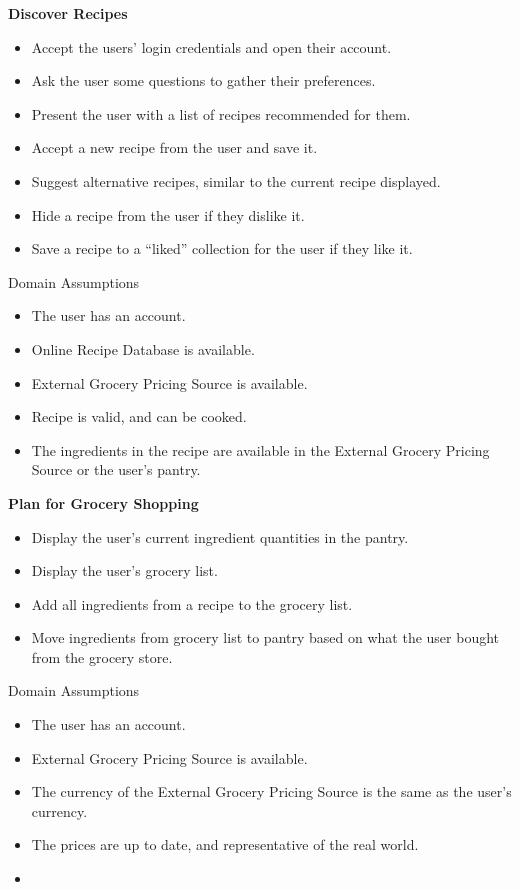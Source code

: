 \documentclass[11pt, letterpaper]{report}
\begin{document}
\noindent \textbf{Discover Recipes}
\begin{itemize}
    \item Accept the users’ login credentials and open their account.
    \item Ask the user some questions to gather their preferences.
    \item Present the user with a list of recipes recommended for them.
    \item Accept a new recipe from the user and save it.
    \item Suggest alternative recipes, similar to the current recipe displayed.
    \item Hide a recipe from the user if they dislike it.
    \item Save a recipe to a “liked” collection for the user if they like it.
\end{itemize}
Domain Assumptions
\begin{itemize}
    \item The user has an account.
    \item Online Recipe Database is available.
    \item External Grocery Pricing Source is available.
    \item Recipe is valid, and can be cooked.
    \item The ingredients in the recipe are available in the External Grocery Pricing Source or the user’s pantry.
\end{itemize}

\noindent \textbf{Plan for Grocery Shopping}
\begin{itemize}
    \item Display the user’s current ingredient quantities in the pantry.
    \item Display the user’s grocery list.
    \item Add all ingredients from a recipe to the grocery list.
    \item Move ingredients from grocery list to pantry based on what the user bought from the grocery store.
\end{itemize}
Domain Assumptions
\begin{itemize}
    \item The user has an account.
    \item External Grocery Pricing Source is available.
    \item The currency of the External Grocery Pricing Source is the same as the user’s currency.
    \item The prices are up to date, and representative of the real world.
    \item 
\end{itemize}
\end{document}
